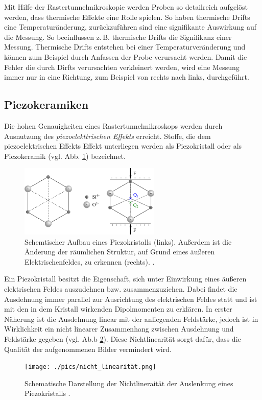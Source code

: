 Mit Hilfe der Rastertunnelmikroskopie werden Proben so detailreich aufgelöst werden, dass thermische Effekte eine Rolle spielen. %
So haben thermische Drifts eine Temperaturänderung, zurückzuführen sind eine signifikante Auswirkung auf die Messung. %
So beeinflussen z.\,B. thermische Drifts die Signifikanz einer Messung. %
Thermische Drifts entstehen bei einer Temperaturveränderung und können zum Beispiel
durch Anfassen der Probe verursacht werden.
Damit die Fehler die durch Dirfts verursachten verkleinert werden, %
wird eine Messung immer nur in eine Richtung, zum Beispiel von rechts nach links, durchgeführt. %

\subsection{Piezokeramiken}

Die hohen Genauigkeiten eines Rastertunnelmikroskops werden durch Ausnutzung des
\emph{piezoelekttrischen Effekts} erreicht. %
Stoffe, die dem piezoelektrischen Effekts Effekt unterliegen werden als Piezokristall %
oder als Piezokeramik (vgl. Abb. \ref{fig: piezo}) bezeichnet.
\begin{figure}[!h]
  \centering
  \includegraphics[width=0.6\textwidth]{./pics/piezo.png}
  \caption{Schemtischer Aufbau eines Piezokristalls (links). Außerdem ist die Änderung der räumlichen Struktur, auf Grund eines
  äußeren Elektrischenfeldes, zu erkennen (rechts). \cite{piezo}.}
  \label{fig: piezo}
\end{figure}
Ein Piezokristall besitzt die Eigenschaft, sich unter Einwirkung eines äußeren
elektrischen Feldes auszudehnen bzw. zusammenzuziehen. Dabei findet die Ausdehnung immer parallel zur
Ausrichtung des elektrischen Feldes statt und ist mit den in dem Kristall wirkenden
Dipolmomenten zu erklären. In erster Näherung ist die Ausdehnung linear mit der anliegenden Feldstärke,
jedoch ist in Wirklichkeit ein nicht linearer Zusammenhang zwischen Ausdehnung und Feldstärke
gegeben (vgl. Ab.b \ref{fig: non_linear}). Diese Nichtlinearität sorgt dafür, dass die Qualität der aufgenommenen Bilder
vermindert wird.
\begin{figure}[!h]
  \centering
  \texttt{[image: ./pics/nicht\_linearität.png]}
  \caption{Schematische Darstellung der Nichtlineraität der Auslenkung eines Piezokristalls \cite{rtm}.} %
  \label{fig: non_linear}
\end{figure}

